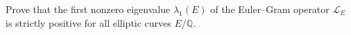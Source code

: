 \begin{openproblem}
Prove that the first nonzero eigenvalue $\lambda_1(E)$ of the
Euler--Gram operator $\mathcal L_E$ is strictly positive for all
elliptic curves $E/\mathbb{Q}$.
\end{openproblem}

